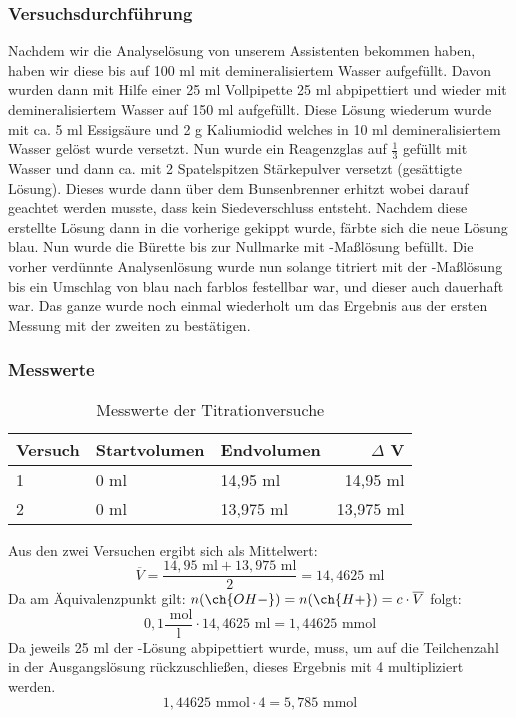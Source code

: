 \documentclass{scrartcl}
\begin{document}
 \subsubsection{Versuchsdurchführung}
Nachdem wir die Analyselösung von unserem Assistenten bekommen haben, haben wir diese bis auf 100 ml mit demineralisiertem Wasser aufgefüllt. Davon wurden dann mit Hilfe einer 25 ml Vollpipette 25 ml abpipettiert und wieder mit demineralisiertem Wasser auf 150 ml aufgefüllt. Diese Lösung wiederum wurde mit ca. 5 ml Essigsäure und 2 g Kaliumiodid welches in 10 ml demineralisiertem Wasser gelöst wurde versetzt. Nun wurde ein Reagenzglas auf $\frac{1}{3}$ gefüllt mit Wasser und dann ca. mit 2 Spatelspitzen Stärkepulver versetzt (gesättigte Lösung). Dieses wurde dann über dem Bunsenbrenner erhitzt wobei darauf geachtet werden musste, dass kein Siedeverschluss entsteht. Nachdem diese erstellte Lösung dann in die vorherige gekippt wurde, färbte sich die neue Lösung blau.
Nun wurde die Bürette bis zur Nullmarke mit -Maßlösung befüllt. Die vorher verdünnte Analysenlösung wurde nun solange titriert mit der -Maßlösung bis ein Umschlag von blau nach farblos festellbar war, und dieser auch dauerhaft war. Das ganze wurde noch einmal wiederholt um das Ergebnis aus der ersten Messung mit der zweiten zu bestätigen. 
\subsubsection{Messwerte}
\begin{table}[h]
	\caption{Messwerte der Titrationversuche}
	\centering
\begin{tabular}{l l l r}
	Versuch & Startvolumen & Endvolumen & $\Delta$ V\\ \hline
	1 & 0 ml & 14,95 ml & 14,95 ml \\
	2 & 0 ml & 13,975 ml & 13,975 ml
\end{tabular}
\end{table}
Aus den zwei Versuchen ergibt sich als Mittelwert:
\begin{equation}
	\overline{V} = \frac{14,95\text{ ml} + 13,975\text{ ml}}{2} = 14,4625\text{ ml}
\end{equation}
Da am Äquivalenzpunkt gilt: $n(\ch{OH-}) = n(\ch{H+}) = c\cdot \overline{V}$ folgt:
\begin{equation}
	0,1\frac{\text{ mol}}{\text{l}}\cdot 14,4625\text{ ml} = 1,44625\text{ mmol}
\end{equation}
Da jeweils 25 ml der -Lösung abpipettiert wurde, muss, um auf die Teilchenzahl in der Ausgangslösung rückzuschließen, dieses Ergebnis mit 4 multipliziert werden.
\begin{equation}
	1,44625\text{ mmol}\cdot 4 = 5,785\text{ mmol}
\end{equation}
\end{document}
